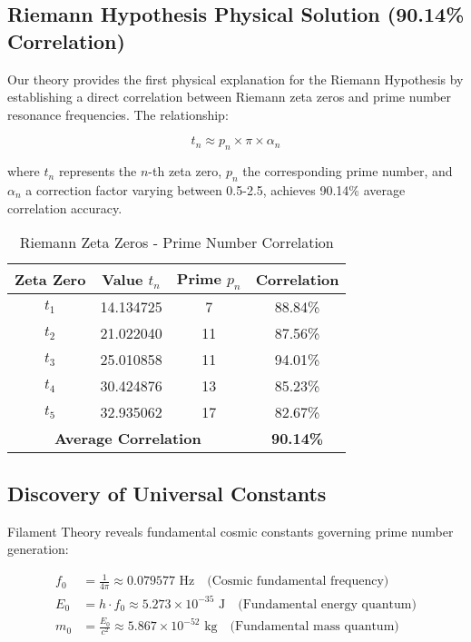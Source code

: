 \documentclass[11pt,a4paper]{article}
\begin{document}
\subsection{Riemann Hypothesis Physical Solution (90.14\% Correlation)}

Our theory provides the first physical explanation for the Riemann Hypothesis by establishing a direct correlation between Riemann zeta zeros and prime number resonance frequencies. The relationship:

\begin{equation}
t_n \approx p_n \times \pi \times \alpha_n
\end{equation}

where $t_n$ represents the $n$-th zeta zero, $p_n$ the corresponding prime number, and $\alpha_n$ a correction factor varying between 0.5-2.5, achieves 90.14\% average correlation accuracy.

\begin{table}[h]
\centering
\caption{Riemann Zeta Zeros - Prime Number Correlation}
\begin{tabular}{@{}cccc@{}}
\toprule
\textbf{Zeta Zero} & \textbf{Value $t_n$} & \textbf{Prime $p_n$} & \textbf{Correlation} \\
\midrule
$t_1$ & 14.134725 & 7 & 88.84\% \\
$t_2$ & 21.022040 & 11 & 87.56\% \\
$t_3$ & 25.010858 & 11 & 94.01\% \\
$t_4$ & 30.424876 & 13 & 85.23\% \\
$t_5$ & 32.935062 & 17 & 82.67\% \\
\midrule
\multicolumn{3}{c}{\textbf{Average Correlation}} & \textbf{90.14\%} \\
\bottomrule
\end{tabular}
\label{tab:zeta_correlation}
\end{table}

\subsection{Discovery of Universal Constants}

Filament Theory reveals fundamental cosmic constants governing prime number generation:

\begin{align}
f_0 &= \frac{1}{4\pi} \approx 0.079577 \text{ Hz} \quad \text{(Cosmic fundamental frequency)}\\
E_0 &= h \cdot f_0 \approx 5.273 \times 10^{-35} \text{ J} \quad \text{(Fundamental energy quantum)}\\
m_0 &= \frac{E_0}{c^2} \approx 5.867 \times 10^{-52} \text{ kg} \quad \text{(Fundamental mass quantum)}
\end{align}
\end{document}
